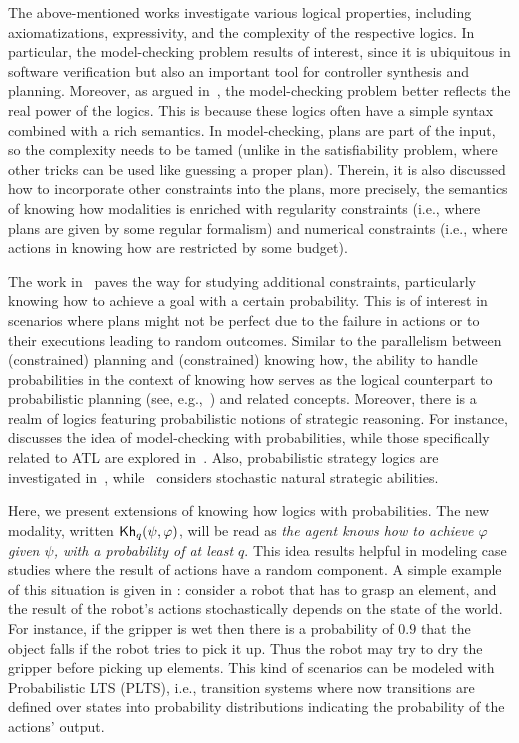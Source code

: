 The above-mentioned works investigate various logical properties, including axiomatizations, expressivity, and the complexity of the respective logics. In particular, the model-checking problem results of interest, since it is  ubiquitous in software verification but also an important tool for controller synthesis and planning. Moreover, as argued in~\cite{DF23}, the model-checking problem better reflects the real power of the logics. This is because these logics often have a simple syntax combined with a rich semantics. In model-checking, plans are part of the input, so the complexity needs to be tamed (unlike in the satisfiability problem, where other tricks can be used like guessing a proper plan). Therein, it is also discussed how to incorporate other constraints into the plans, more precisely, the semantics of knowing how modalities is enriched with regularity constraints (i.e., where plans are given by some regular formalism) and numerical constraints (i.e., where actions in knowing how are restricted by some budget). 

The work in~\cite{DF23} paves the way for studying additional constraints, particularly knowing how to achieve a goal with a certain probability. This is of interest in scenarios where plans might not be perfect due to the 
failure in actions or to their executions leading to random outcomes. Similar to the parallelism between (constrained) planning and (constrained) knowing how, the ability to handle probabilities in the context of knowing how serves as the logical counterpart to probabilistic planning (see, e.g.,~\cite{MadaniHC99}) and related concepts. Moreover, there is a realm of logics featuring probabilistic notions of strategic reasoning. For instance, \cite{BaierAFK18} discusses the idea of model-checking with probabilities, while those specifically related to ATL are explored in~\cite{BA95,TJ07,BullingJ09}. Also, probabilistic strategy logics are investigated in~\cite{AKMM19}, while~\cite{BerthonKMM24} considers stochastic natural strategic abilities. %

Here, we present extensions of knowing how logics with probabilities. The new modality, written ${\mathsf{Kh}}_q(\psi,\varphi)$, will be read as \emph{the agent knows how to achieve $\varphi$ given $\psi$, with a probability of at least $q$}. This idea results helpful in modeling case studies where the result of actions have a random component. A simple example of this situation is given in \cite{Kushmerick1995}: consider a robot that has to grasp an element, and  the result of the robot's actions stochastically depends on the state of the world. For instance,  if the gripper is wet then there is  a probability of $0.9$ that the object falls if the robot tries to pick it up.  Thus the robot may try to dry the gripper before picking up elements.   This kind of scenarios can be modeled with Probabilistic LTS (PLTS), i.e., transition systems where now transitions are defined over states into probability distributions indicating the probability of the actions' output. 

